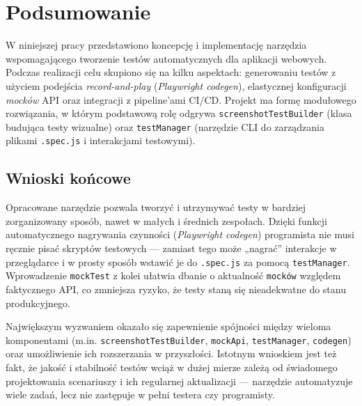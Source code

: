 \documentclass[12pt]{report}
\begin{document}
\chapter{Podsumowanie}
W niniejszej pracy przedstawiono koncepcję i implementację narzędzia wspomagającego tworzenie testów automatycznych dla aplikacji webowych. Podczas realizacji celu skupiono się na kilku aspektach: generowaniu testów z użyciem podejścia \emph{record-and-play} (\textit{Playwright codegen}), elastycznej konfiguracji \emph{mocków} API oraz integracji z pipeline’ami CI/CD. Projekt ma formę modułowego rozwiązania, w którym podstawową rolę odgrywa \texttt{screenshotTestBuilder} (klasa budująca testy wizualne) oraz \texttt{testManager} (narzędzie CLI do zarządzania plikami \texttt{.spec.js} i interakcjami testowymi).

\section{Wnioski końcowe}
Opracowane narzędzie pozwala tworzyć i utrzymywać testy w bardziej zorganizowany sposób, nawet w małych i średnich zespołach. Dzięki funkcji automatycznego nagrywania czynności (\emph{Playwright codegen}) programista nie musi ręcznie pisać skryptów testowych — zamiast tego może „nagrać” interakcje w przeglądarce i w prosty sposób wstawić je do \texttt{.spec.js} za pomocą \texttt{testManager}. Wprowadzenie \texttt{mockTest} z kolei ułatwia dbanie o aktualność \texttt{mocków} względem faktycznego API, co zmniejsza ryzyko, że testy staną się nieadekwatne do stanu produkcyjnego.  

Największym wyzwaniem okazało się zapewnienie spójności między wieloma komponentami (m.in. \texttt{screenshotTestBuilder}, \texttt{mockApi}, \texttt{testManager}, \texttt{codegen}) oraz umożliwienie ich rozszerzania w przyszłości. Istotnym wnioskiem jest też fakt, że jakość i stabilność testów wciąż w dużej mierze zależą od świadomego projektowania scenariuszy i ich regularnej aktualizacji — narzędzie automatyzuje wiele zadań, lecz nie zastępuje w pełni testera czy programisty.
\end{document}
